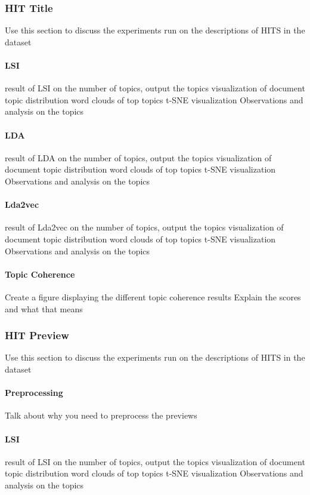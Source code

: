 \documentclass[letterpaper,12pt]{article}
\begin{document}
\subsubsection{HIT Title}
Use this section to discuss the experiments run on the descriptions of HITS in the dataset

\paragraph{LSI}
result of LSI on the number of topics, output the topics
visualization of document topic distribution
word clouds of top topics
t-SNE visualization
Observations and analysis on the topics

\paragraph{LDA}
result of LDA on the number of topics, output the topics
visualization of document topic distribution
word clouds of top topics
t-SNE visualization
Observations and analysis on the topics

\paragraph{Lda2vec}
result of Lda2vec on the number of topics, output the topics
visualization of document topic distribution
word clouds of top topics
t-SNE visualization
Observations and analysis on the topics

\paragraph{Topic Coherence}
Create a figure displaying the different topic coherence results
Explain the scores and what that means

\subsubsection{HIT Preview}
Use this section to discuss the experiments run on the descriptions of HITS in the dataset

\paragraph{Preprocessing}
Talk about why you need to preprocess the previews
\paragraph{LSI}
result of LSI on the number of topics, output the topics
visualization of document topic distribution
word clouds of top topics
t-SNE visualization
Observations and analysis on the topics
\end{document}
